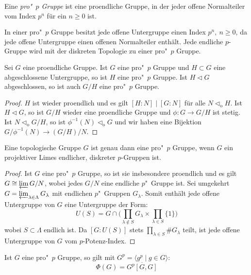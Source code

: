 \documentclass[11pt,a4paper,openany]{memoir}
\begin{document}
\begin{definition}
Eine \textit{pro"~$p$ Gruppe} ist eine proendliche Gruppe, in der jeder offene Normalteiler vom Index $p^n$ für ein $n\geq 0$ ist.
\end{definition}

\begin{remark}
In einer pro"~$p$ Gruppe besitzt jede offene Untergruppe einen Index $p^n,\ n\geq 0$, da jede offene Untergruppe einen offenen Normalteiler enthält. Jede endliche $p$-Gruppe wird mit der diskreten Topologie zu einer pro"~$p$ Gruppe.
\end{remark}

\begin{proposition}\label{1.11}
Sei $G$ eine proendliche Gruppe. Ist $G$ eine pro"~$p$ Gruppe und $H\subset G$ eine abgeschlossene Untergruppe, so ist $H$ eine pro"~$p$ Gruppe. Ist $H\lhd G$ abgeschlossen, so ist auch $G/H$ eine pro"~$p$ Gruppe.
\end{proposition}

\begin{proof}
$H$ ist wieder proendlich und es gilt $[H:N]\mid [G:N]$ für alle $N\lhd_\text{o}H$. Ist $H\lhd G$, so ist $G/H$ wieder eine proendliche Gruppe und $\phi:G\to G/H$ ist stetig. Ist $N\lhd_\text{o}G/H$, so ist $\phi^{-1}(N)\lhd_\text{o}G$ und wir haben eine Bijektion $G/\phi^{-1}(N)\to (G/H)/N$.
\end{proof}

\begin{proposition}\label{1.12}
Eine topologische Gruppe $G$ ist genau dann eine pro"~$p$ Gruppe, wenn $G$ ein projektiver Limes endlicher, diskreter $p$-Gruppen ist.
\end{proposition}

\begin{proof}
Ist $G$ eine pro"~$p$ Gruppe, so ist sie insbesondere proendlich und es gilt $G\cong\varprojlim G/N$, wobei jedes $G/N$ eine endliche $p$"~Gruppe ist. Sei umgekehrt $G=\varprojlim_{\lambda\in\Lambda}G_\lambda$ mit endlichen $p$"~Gruppen $G_\lambda$. Somit enthält jede offene Untergruppe von $G$ eine Untergruppe der Form:
\[ U(S) = G\cap \Big(\prod_{\lambda\not\in S}G_\lambda\times \prod_{\lambda\in S}\{1\}\Big) \]
wobei $S\subset\Lambda$ endlich ist. Da $[G:U(S)]$ stets $\prod_{\lambda\in S}\#G_\lambda$ teilt, ist jede offene Untergruppe von $G$ vom $p$-Potenz-Index.
\end{proof}

\begin{proposition}\label{1.13}
Ist $G$ eine pro"~$p$ Gruppe, so gilt mit $G^p=\langle g^p\mid g\in G\rangle$:
\[\Phi(G)=\overline{G^p[G,G]} \]
\end{proposition}
\end{document}
